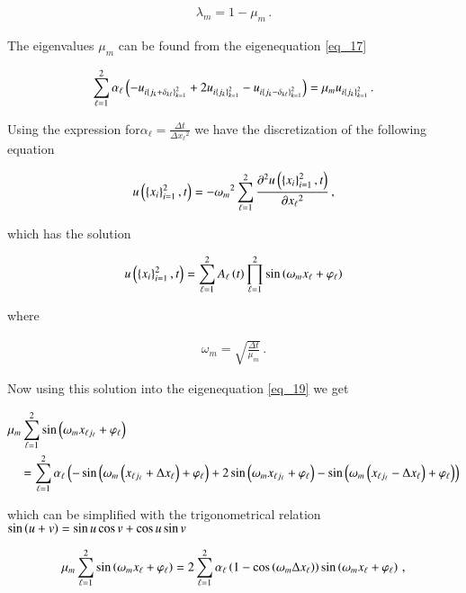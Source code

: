 \documentclass[11pt,english,a4paper]{article}
\begin{document}
\begin{flushleft}
\begin{align}
\lambda_m = 1 - \mu_m\,.
\label{eq_18}
\end{align}

The eigenvalues $\mu_m$ can be found from the eigenequation \eqref{eq_17}

\begin{align}
\sum_{\ell=1}^2\alpha_\ell\left({-u_{i\left\lbrace{j_k + \delta_{k\ell}}\right\rbrace_{k=1}^2} + 2 u_{i\left\lbrace{j_k}\right\rbrace_{k=1}^2}-u_{i\left\lbrace{j_k - \delta_{k\ell}}\right\rbrace_{k=1}^2}}\right) = \mu_m u_{i\left\lbrace{j_k}\right\rbrace_{k=1}^2} \,.
\label{eq_19}
\end{align}

Using the expression for$\alpha_\ell = \frac{\Delta t}{\Delta {x_\ell}^2}$ we have the discretization of the following equation

\begin{align*}
u\left({\left\lbrace{x_i}\right\rbrace_{i=1}^2,t}\right) = -{\omega_{m}}^2 \sum_{\ell=1}^2 \frac{\partial^2 u\left({\left\lbrace{x_i}\right\rbrace_{i=1}^2,t}\right)}{\partial {x_\ell}^2}\,,
\end{align*}

which has the solution 

\begin{align*}
u\left({\left\lbrace{x_i}\right\rbrace_{i=1}^2, t}\right) = \sum_{\ell=1}^2 A_\ell\left({t}\right) \prod_{\ell=1}^2 \sin\left({\omega_{m} x_\ell + \varphi_\ell}\right)
\end{align*}

where 

\begin{align*}
\omega_{m} = \sqrt{\frac{\Delta t}{\mu_m}}\,.
\end{align*}

Now using this solution into the eigenequation \eqref{eq_19} we get

\begin{align*}
&\mu_m \sum_{\ell=1}^2\sin\left({\omega_{m} x_{\ell j_\ell} + \varphi_\ell}\right)
\\
&\quad =
\sum_{\ell=1}^2 \alpha_\ell\left({-\sin\left({\omega_{m} \left({x_{\ell j_\ell}+\Delta x_\ell}\right) + \varphi_\ell}\right) + 2\sin\left({\omega_{m} x_{\ell j_\ell} + \varphi_\ell}\right) - \sin\left({\omega_{m} \left({x_{\ell j_\ell}-\Delta x_\ell}\right) + \varphi_\ell}\right)}\right)
\end{align*} 

which can be simplified with the trigonometrical relation $\sin\left({u+v}\right) = \sin u \cos v + \cos u \sin v$
 
\begin{align}
\mu_m\sum_{\ell=1}^2\sin\left({\omega_m x_\ell + \varphi_\ell}\right) = 2\sum_{\ell=1}^2 \alpha_\ell\left({1-\cos\left({\omega_{m} \Delta x_\ell}\right)}\right)\sin\left({\omega_m x_\ell + \varphi_\ell}\right) \,,
\label{eq_20}
\end{align}


\end{flushleft}
\end{document}
